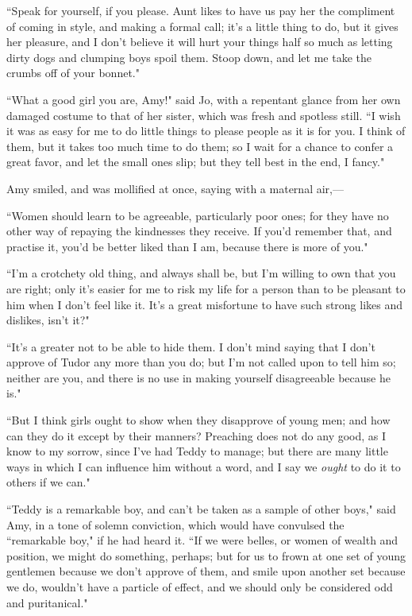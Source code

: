 ``Speak for yourself, if you please. Aunt likes to have us pay her the
compliment of coming in style, and making a formal call;
it's a little thing to do, but it gives her pleasure,
and I don't believe it will hurt your things half so
much as letting dirty dogs and clumping boys spoil them. Stoop down, and
let me take the crumbs off of your bonnet."

``What a good girl you are, Amy!" said Jo, with a repentant glance from
her own damaged costume to that of her sister, which was fresh and
spotless still. ``I wish it was as easy for me to do little things to
please people as it is for you. I think of them, but it takes too much
time to do them; so I wait for a chance to confer a great favor, and let
the small ones slip; but they tell best in the end, I fancy."

Amy smiled, and was mollified at once, saying with a maternal air,---

``Women should learn to be agreeable, particularly poor ones; for they
have no other way of repaying the kindnesses they receive. If
you'd remember that, and practise it,
you'd be better liked than I am, because there is more
of you."

``I'm a crotchety old thing, and always shall be, but
I'm willing to own that you are right; only
it's easier for me to risk my life for a person than to
be pleasant to him when I don't feel like it.
It's a great misfortune to have such strong likes and
dislikes, isn't it?"

``It's a greater not to be able to hide them. I
don't mind saying that I don't approve
of Tudor any more than you do; but I'm not called upon
to tell him so; neither are you, and there is no use in making yourself
disagreeable because he is."

``But I think girls ought to show when they disapprove of young men; and
how can they do it except by their manners? Preaching does not do any
good, as I know to my sorrow, since I've had Teddy to
manage; but there are many little ways in which I can influence him
without a word, and I say we \emph{ought} to do it to others if we can."

``Teddy is a remarkable boy, and can't be taken as a
sample of other boys," said Amy, in a tone of solemn conviction, which
would have convulsed the ``remarkable boy," if he had heard it. ``If we
were belles, or women of wealth and position, we might do something,
perhaps; but for us to frown at one set of young gentlemen because we
don't approve of them, and smile upon another set
because we do, wouldn't have a particle of effect, and
we should only be considered odd and puritanical."

